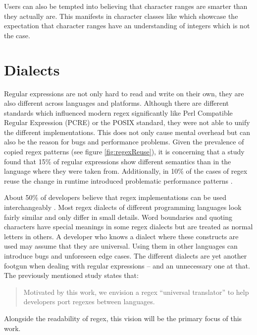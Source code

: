 Users can also be tempted into believing that character ranges are smarter than they actually are. This manifests in character classes like \pattern{[0-31]} \cite{RegexErrorHadoopNumberRange} which showcase the expectation that character ranges have an understanding of integers which is not the case.

\section{Dialects}

Regular expressions are not only hard to read and write on their own, they are also different across languages and platforms. Although there are different standards which influenced modern regex significantly like Perl Compatible Regular Expression (PCRE) or the POSIX standard, they were not able to unify the different implementations. This does not only cause mental overhead but can also be the reason for bugs and performance problems. Given the prevalence of copied regex patterns (see figure \ref{fig:regexReuse}), it is concerning that a study found that 15\% of regular expressions show different semantics than in the language where they were taken from. Additionally, in 10\% of the cases of regex reuse the change in runtime introduced problematic performance patterns \cite{RegexNotLinguaFranca}.

About 50\% of developers believe that regex implementations can be used interchangeably \cite{RegexNotLinguaFranca}. Most regex dialects of different programming languages look fairly similar and only differ in small details. Word boundaries  and quoting characters  have special meanings in some regex dialects but are treated as normal letters in others. A developer who knows a dialect where these constructs are used may assume that they are universal. Using them in other languages can introduce bugs and unforeseen edge cases. The different dialects are yet another footgun when dealing with regular expressions -- and an unnecessary one at that. The previously mentioned study \cite{RegexNotLinguaFranca} states that:

{\small
\vspace{-1em}
\begin{quote}
    Motivated by this work, we envision a regex \enquote{universal translator} to help developers port regexes between languages.
\end{quote}
}

\noindent Alongside the readability of regex, this vision will be the primary focus of this work.

